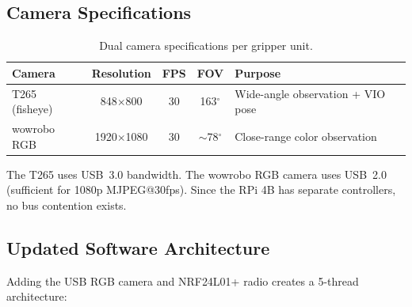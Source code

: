 \documentclass[11pt,a4paper]{article}
\begin{document}
\subsection{Camera Specifications}

\begin{table}[htbp]
\centering
\caption{Dual camera specifications per gripper unit.}
\begin{tabular}{l c c c l}
\toprule
\textbf{Camera} & \textbf{Resolution} & \textbf{FPS} & \textbf{FOV} & \textbf{Purpose} \\
\midrule
T265 (fisheye) & 848$\times$800 & 30 & 163$^\circ$ & Wide-angle observation + VIO pose \\
wowrobo RGB & 1920$\times$1080 & 30 & ${\sim}$78$^\circ$ & Close-range color observation \\
\bottomrule
\end{tabular}
\label{tab:cameras}
\end{table}

The T265 uses USB~3.0 bandwidth. The wowrobo RGB camera uses USB~2.0 (sufficient for 1080p MJPEG@30fps). Since the RPi 4B has separate controllers, no bus contention exists.

\subsection{Updated Software Architecture}

Adding the USB RGB camera and NRF24L01+ radio creates a 5-thread architecture:
\end{document}
